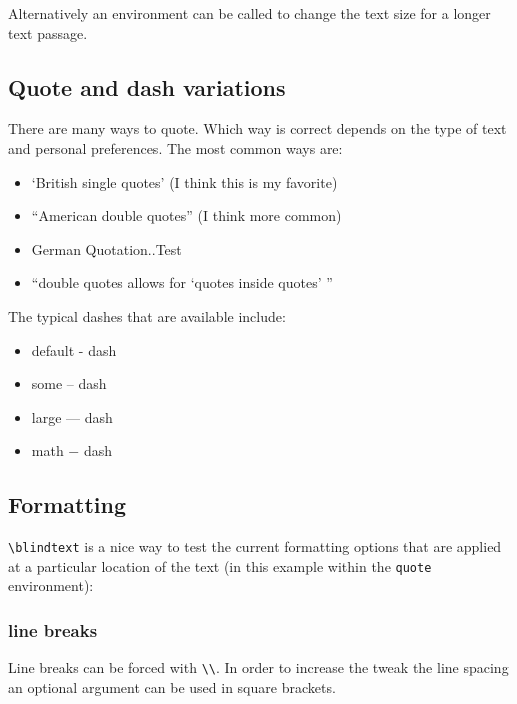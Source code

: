 \documentclass[a4paper]{scrartcl}
\begin{document}
	\begin{scriptsize}
		Alternatively an environment can be called to change the text size for a longer text passage.
	\end{scriptsize}


\subsection{Quote and dash variations}
	There are many ways to quote. Which way is correct depends on the type of text and personal preferences. The most common ways are:
	
	\begin{itemize}
		\item `British single quotes' (I think this is my favorite)
		\item ``American double quotes'' (I think more common)
		\item \glqq German Quotation.\grqq.Test
		\item ``double quotes allows for `quotes inside quotes' ''
	\end{itemize}

The typical dashes that are available include:

	\begin{itemize}
		\item default - dash
		\item some -- dash
		\item large --- dash
		\item math $-$ dash
	\end{itemize}





	\subsection{Formatting}
	
\texttt{\textbackslash blindtext} is a nice way to test the current formatting options that are applied at a particular location of the text (in this example within the \texttt{quote} environment):
\begin{quote}
	\blindtext
\end{quote}


\subsubsection{line breaks}
Line breaks can be forced with \texttt{\textbackslash \textbackslash}. In order to increase the tweak the line spacing an optional argument can be used in square brackets.\\
\end{document}
